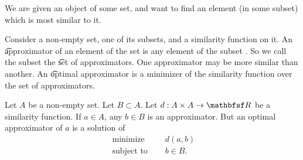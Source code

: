 
\sbasic




























\sstart
{}


We are given an object of some set, and want to find an element (in some subset) which is most similar to it.


Consider a non-empty set, one of its subsets, and a similarity function on it.
An \t{approximator} of an element of the set is any element of the subset .
So we call the subset the \t{set of approximators}.
One approximator may be more similar than another.
An \t{optimal approximator} is a minimizer of the similarity function over the set of approximators.


Let $A$ be a non-empty set.
Let $B \subset A$.
Let $d: A \times A \to \R$ be a similarity function.
If $a \in A$, any $b \in B$ is an approximator.
But an optimal approximator of $a$ is a solution of
$$
\begin{aligned}
  \text{ minimize }   & \quad d(a, b) \\
  \text{ subject to } & \quad b \in B.
\end{aligned}
$$
\strats
